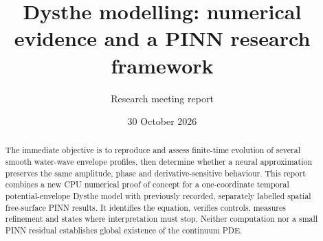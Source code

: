 \documentclass[11pt]{article}
\title{Dysthe modelling: numerical evidence and a PINN research framework}
\author{Research meeting report}
\date{30 October 2026}
\begin{document}
\maketitle
\begin{abstract}
The immediate objective is to reproduce and assess finite-time evolution of several smooth water-wave envelope profiles, then determine whether a neural approximation preserves the same amplitude, phase and derivative-sensitive behaviour. This report combines a new CPU numerical proof of concept for a one-coordinate temporal potential-envelope Dysthe model with previously recorded, separately labelled spatial free-surface PINN results. It identifies the equation, verifies controls, measures refinement and states where interpretation must stop. Neither computation nor a small PINN residual establishes global existence of the continuum PDE.
\end{abstract}
\end{document}
